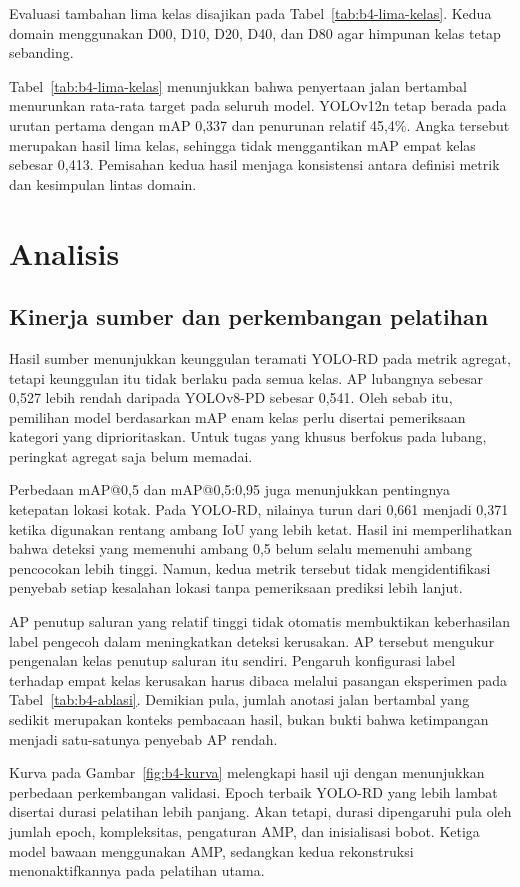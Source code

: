 Evaluasi tambahan lima kelas disajikan pada Tabel~\ref{tab:b4-lima-kelas}. Kedua domain menggunakan D00, D10, D20, D40, dan D80 agar himpunan kelas tetap sebanding.

Tabel~\ref{tab:b4-lima-kelas} menunjukkan bahwa penyertaan jalan bertambal menurunkan rata-rata target pada seluruh model. YOLOv12n tetap berada pada urutan pertama dengan mAP 0,337 dan penurunan relatif 45,4\%. Angka tersebut merupakan hasil lima kelas, sehingga tidak menggantikan mAP empat kelas sebesar 0,413. Pemisahan kedua hasil menjaga konsistensi antara definisi metrik dan kesimpulan lintas domain.

\section{Analisis}
\subsection{Kinerja sumber dan perkembangan pelatihan}
Hasil sumber menunjukkan keunggulan teramati YOLO-RD pada metrik agregat, tetapi keunggulan itu tidak berlaku pada semua kelas. AP lubangnya sebesar 0,527 lebih rendah daripada YOLOv8-PD sebesar 0,541. Oleh sebab itu, pemilihan model berdasarkan mAP enam kelas perlu disertai pemeriksaan kategori yang diprioritaskan. Untuk tugas yang khusus berfokus pada lubang, peringkat agregat saja belum memadai.

Perbedaan mAP@0,5 dan mAP@0,5:0,95 juga menunjukkan pentingnya ketepatan lokasi kotak. Pada YOLO-RD, nilainya turun dari 0,661 menjadi 0,371 ketika digunakan rentang ambang IoU yang lebih ketat. Hasil ini memperlihatkan bahwa deteksi yang memenuhi ambang 0,5 belum selalu memenuhi ambang pencocokan lebih tinggi. Namun, kedua metrik tersebut tidak mengidentifikasi penyebab setiap kesalahan lokasi tanpa pemeriksaan prediksi lebih lanjut.

AP penutup saluran yang relatif tinggi tidak otomatis membuktikan keberhasilan label pengecoh dalam meningkatkan deteksi kerusakan. AP tersebut mengukur pengenalan kelas penutup saluran itu sendiri. Pengaruh konfigurasi label terhadap empat kelas kerusakan harus dibaca melalui pasangan eksperimen pada Tabel~\ref{tab:b4-ablasi}. Demikian pula, jumlah anotasi jalan bertambal yang sedikit merupakan konteks pembacaan hasil, bukan bukti bahwa ketimpangan menjadi satu-satunya penyebab AP rendah.

Kurva pada Gambar~\ref{fig:b4-kurva} melengkapi hasil uji dengan menunjukkan perbedaan perkembangan validasi. Epoch terbaik YOLO-RD yang lebih lambat disertai durasi pelatihan lebih panjang. Akan tetapi, durasi dipengaruhi pula oleh jumlah epoch, kompleksitas, pengaturan AMP, dan inisialisasi bobot. Ketiga model bawaan menggunakan AMP, sedangkan kedua rekonstruksi menonaktifkannya pada pelatihan utama.


